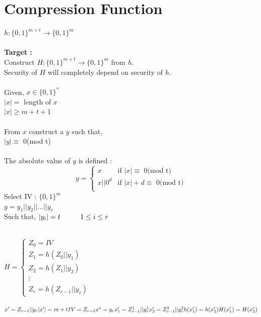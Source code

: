 \documentclass[11pt]{article}
\begin{document}
\section*{Compression Function}
$h : \{0,1\}^{m+t} \rightarrow \{0,1\}^{m}$ \\\\
\textbf{Target : } \\
Construct $ H : \{0,1\}^{m+t} \rightarrow \{0,1\}^{m}$ from $h$. \\
Security of $H$ will completely depend on security of $h$. \\\\
Given, $x \in \{0,1\}^{*}$ \\
\hspace*{1.2cm}$|x| = $ length of $x$ \\
\hspace*{1.2cm}$|x| \geq m+t+1 $ \\\\
From $x$ construct a $y$ such that, \\
$|y| \equiv$ 0(mod t) \\\\
The absolute value of $ y $ is defined :
\[ y = \begin{cases}
x & \mbox{if $|x| \equiv$ 0(mod t) } \\
x || 0^{d} & \mbox{if $|x| + d \equiv$ 0(mod t)}\\
\end{cases}
\] 
Select IV : $\{0,1\}^{m}$ \\
$ y = y_{1} || y_{2} || ... || y_{r}$ \\
Such that, $|y_{i}| = t \hspace*{1cm} 1 \leq i \leq r$ \\\\
\begin{center}
$ H = 
\begin{cases}
Z_{0} = IV \\
Z_{1} = h(Z_{0} || y_{1}) \\ 
Z_{2} = h(Z_{1} || y_{2}) \\
\vdots \\
Z_{r} = h(Z_{r-1} || y_{r}) 
\end{cases} $
\end{center}
$
x' = Z_{r-1} || y_{r} \\
|x'| = m + t \\
IV = Z_{r-1} \\\\
x^{*} = y_{r} \\
x'_{1} = Z^{1}_{r-1} || y^{1}_{r} \\
x'_{2} = Z^{2}_{r-1} || y^{2}_{r} \\\\
h(x'_{1}) = h(x'_{2}) \\
H(x'_{1}) = H(x'_{2}) $
\end{document}
